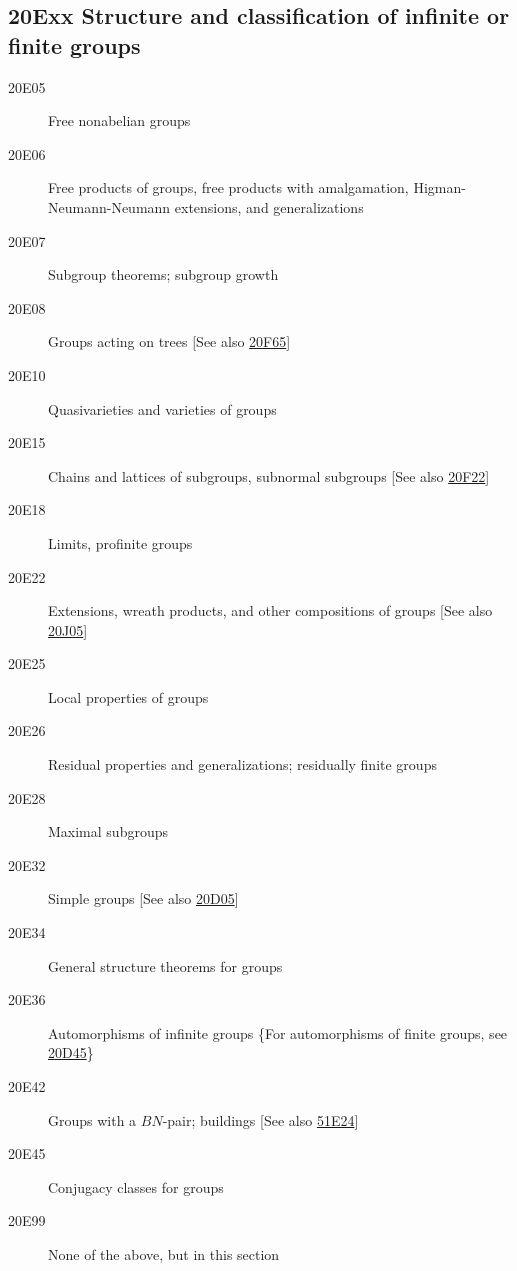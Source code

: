 \subsection*{20Exx  Structure and classification of infinite or finite groups}\label{20Exx}
\begin{description}  
\item [20E05]\label{20E05} Free nonabelian groups
\item [20E06]\label{20E06} Free products of groups, free products with amalgamation, Higman-Neumann-Neumann extensions, and generalizations
\item [20E07]\label{20E07} Subgroup theorems; subgroup growth
\item [20E08]\label{20E08} Groups acting on trees [See also \hyperref[20F65]{20F65}]
\item [20E10]\label{20E10} Quasivarieties and varieties of groups
\item [20E15]\label{20E15} Chains and lattices of subgroups, subnormal subgroups [See also \hyperref[20F22]{20F22}]
\item [20E18]\label{20E18} Limits, profinite groups
\item [20E22]\label{20E22} Extensions, wreath products, and other compositions of groups [See also \hyperref[20J05]{20J05}]
\item [20E25]\label{20E25} Local properties of groups
\item [20E26]\label{20E26} Residual properties and generalizations; residually finite groups
\item [20E28]\label{20E28} Maximal subgroups
\item [20E32]\label{20E32} Simple groups [See also \hyperref[20D05]{20D05}]
\item [20E34]\label{20E34} General structure theorems for groups
\item [20E36]\label{20E36} Automorphisms of infinite groups \{For automorphisms of finite groups, see \hyperref[20D45]{20D45}\}
\item [20E42]\label{20E42} Groups with a $BN$-pair; buildings [See also \hyperref[51E24]{51E24}]
\item [20E45]\label{20E45} Conjugacy classes for groups
\item [20E99]\label{20E99} None of the above, but in this section
\end{description}
